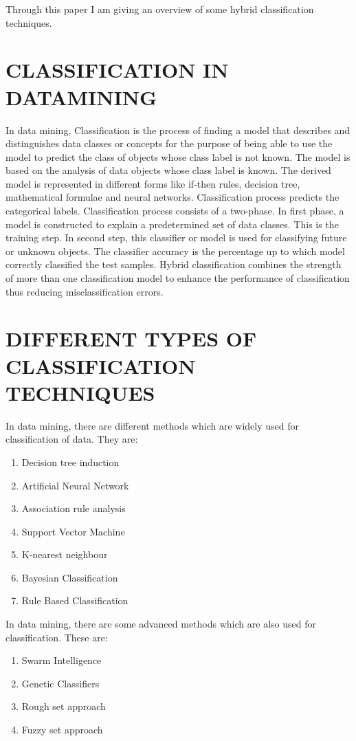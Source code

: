 \documentclass[10pt,a4paper,journal]{IEEEtran}
\begin{document}
\hspace{2em} Through this paper I am giving an overview of some hybrid classification techniques.


\section{CLASSIFICATION IN DATAMINING}

\hspace{2em} 
In data mining, Classification is the process of finding a model that describes and distinguishes data classes or concepts for the purpose of being able to use the model to predict the class of objects whose class label is not known. The model is based on the analysis of data objects whose class label is known. The derived model is represented in different forms like if-then rules, decision tree, mathematical formulae and neural networks. Classification process predicts the categorical labels. Classification process consists of a two-phase. In first phase, a model is constructed to explain a predetermined set of data classes. This is the training step. In second step, this classifier or model is used for classifying future or unknown objects. The classifier accuracy is the percentage up to which model correctly classified the test samples. Hybrid classification combines the strength of more than one classification model to enhance the performance of classification thus reducing misclassification errors.




\section{DIFFERENT TYPES OF CLASSIFICATION TECHNIQUES}
\hspace{2em}  In data mining, there are different methods which are widely used for classification of data. They are:
\begin{enumerate}
\item Decision tree induction
\item Artificial Neural Network
\item Association rule analysis
\item Support Vector Machine
\item K-nearest neighbour
\item Bayesian Classification 
\item Rule Based Classification
\end{enumerate}
\hspace{2em} In data mining, there are some advanced methods which are also used for classification. These are:
\begin{enumerate}
\item Swarm Intelligence
\item Genetic Classifiers
\item Rough set approach
\item Fuzzy set approach
\end{enumerate}
\end{document}
